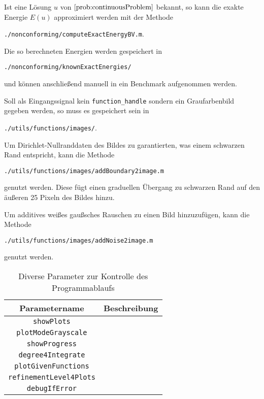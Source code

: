 Ist eine Lösung $u$ von $\Cref{prob:continuousProblem}$ bekannt, so kann die
exakte Energie $E(u)$ approximiert werden mit der Methode
\begin{center}
  \texttt{./nonconforming/computeExactEnergyBV.m}.
\end{center}
Die so berechneten Energien werden gespeichert in 
\begin{center}
  \texttt{./nonconforming/knownExactEnergies/}
\end{center}
und können anschließend manuell in ein Benchmark aufgenommen werden.

Soll als Eingangssignal kein \texttt{function\_handle} sondern ein
Graufarbenbild gegeben werden, so muss es gespeichert sein in 
\begin{center}
  \texttt{./utils/functions/images/}.
\end{center}
Um Dirichlet-Nullranddaten des Bildes zu garantierten, was einem schwarzen Rand
entspricht, kann die Methode 
\begin{center}
  \texttt{./utils/functions/images/addBoundary2image.m}
\end{center}
genutzt werden. Diese fügt einen graduellen Übergang zu schwarzen Rand auf den 
äußeren 25 Pixeln des Bildes hinzu.

Um additives weißes gaußsches Rauschen zu einen Bild hinzuzufügen, kann die
Methode
\begin{center}
  \texttt{./utils/functions/images/addNoise2image.m}
\end{center}
genutzt werden. 

\begin{table}
  \centering
  \begin{tabular}{c|p{9cm}}
    \hline
    Parametername  & Beschreibung\\  
    \hline
    \texttt{showPlots} & \\
    \texttt{plotModeGrayscale} & \\
    \texttt{showProgress}& \\
    \texttt{degree4Integrate}& \\
    \texttt{plotGivenFunctions}&\\
    \texttt{refinementLevel4Plots}& \\
    \texttt{debugIfError}& \\
    \hline
  \end{tabular}
  \caption{Diverse Parameter zur Kontrolle des Programmablaufs}
  \label{tab:paramsMisc}
\end{table} 

